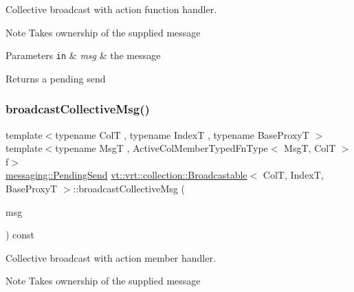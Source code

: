 Collective broadcast with action function handler. 

\begin{DoxyNote}{Note}
Takes ownership of the supplied message
\end{DoxyNote}

\begin{DoxyParams}[1]{Parameters}
\mbox{\tt in}  & {\em msg} & the message\\
\hline
\end{DoxyParams}
\begin{DoxyReturn}{Returns}
a pending send 
\end{DoxyReturn}
\mbox{\label{structvt_1_1vrt_1_1collection_1_1_broadcastable_a70ec0f06ef5566c713a4d960a8faa39b}} 
\subsubsection{\texorpdfstring{broadcast\+Collective\+Msg()}{broadcastCollectiveMsg()}\hspace{0.1cm}{\footnotesize\ttfamily [2/3]}}
{\footnotesize\ttfamily template$<$typename ColT , typename IndexT , typename Base\+ProxyT $>$ \\
template$<$typename MsgT , Active\+Col\+Member\+Typed\+Fn\+Type$<$ Msg\+T, Col\+T $>$ f$>$ \\
\hyperlink{structvt_1_1messaging_1_1_pending_send}{messaging\+::\+Pending\+Send} \hyperlink{structvt_1_1vrt_1_1collection_1_1_broadcastable}{vt\+::vrt\+::collection\+::\+Broadcastable}$<$ ColT, IndexT, Base\+ProxyT $>$\+::broadcast\+Collective\+Msg (\begin{DoxyParamCaption}\item[{\hyperlink{structvt_1_1messaging_1_1_msg_ptr_thief}{messaging\+::\+Msg\+Ptr\+Thief}$<$ MsgT $>$}]{msg }\end{DoxyParamCaption}) const}



Collective broadcast with action member handler. 

\begin{DoxyNote}{Note}
Takes ownership of the supplied message
\end{DoxyNote}

